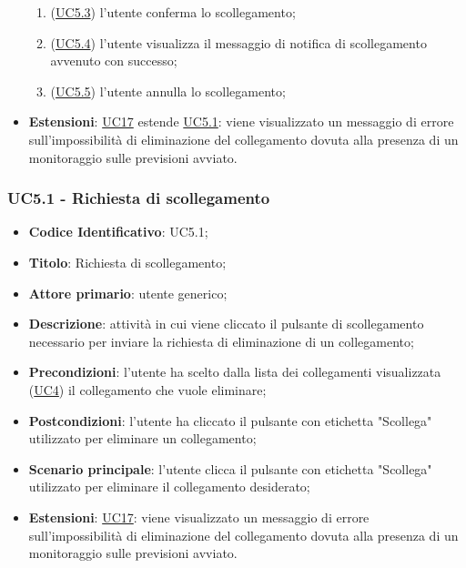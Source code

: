 \begin{itemize}
\begin{enumerate}
				\item (\hyperref[par:UC5.3]{UC5.3}) l'utente conferma lo scollegamento;
				\item (\hyperref[par:UC5.4]{UC5.4}) l'utente visualizza il messaggio di notifica di scollegamento avvenuto con successo;
				\item (\hyperref[par:UC5.5]{UC5.5}) l'utente annulla lo scollegamento;
			\end{enumerate}	
			\item\textbf{Estensioni}: \hyperref[par:UC17]{UC17} estende \hyperref[par:UC5.1]{UC5.1}: viene visualizzato un messaggio di errore sull'impossibilità di eliminazione del collegamento dovuta alla presenza di un monitoraggio sulle previsioni avviato.		
			\end{itemize}
			
			\label{par:UC5.1}
	\subsubsection{UC5.1 - Richiesta di scollegamento}
		\begin{itemize}
			\item\textbf{Codice Identificativo}: UC5.1;
			\item\textbf{Titolo}: Richiesta di scollegamento;
			\item\textbf{Attore primario}: utente generico;
			\item\textbf{Descrizione}: attività in cui viene cliccato il pulsante di scollegamento necessario per inviare la richiesta di eliminazione di un collegamento;
			\item\textbf{Precondizioni}: l'utente ha scelto dalla lista dei collegamenti visualizzata (\hyperref[par:UC4]{UC4}) il collegamento che vuole eliminare;
			\item\textbf{Postcondizioni}: l'utente ha cliccato il pulsante con etichetta "Scollega" utilizzato per eliminare un collegamento;
			\item\textbf{Scenario principale}: l'utente clicca il pulsante con etichetta "Scollega" utilizzato per eliminare il collegamento desiderato;
			\item\textbf{Estensioni}: \hyperref[par:UC17]{UC17}: viene visualizzato un messaggio di errore sull'impossibilità di eliminazione del collegamento dovuta alla presenza di un monitoraggio sulle previsioni avviato.					
	
		\end{itemize}		
		
		
	\label{par:UC5.2}
